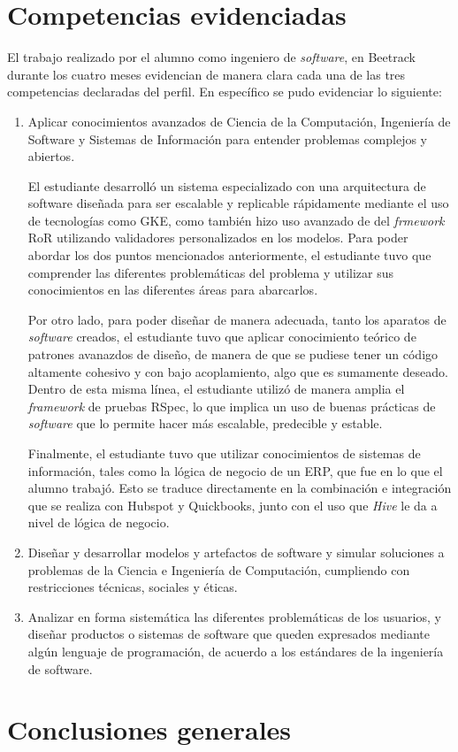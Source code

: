 \section{Competencias evidenciadas}

  El trabajo realizado por el alumno como ingeniero de \textit{software}, en Beetrack durante los cuatro meses evidencian de manera clara cada una de las tres competencias declaradas del perfil. En específico se pudo evidenciar lo siguiente:

  \begin{enumerate}
    \item Aplicar conocimientos avanzados de Ciencia de la Computación, Ingeniería de Software y Sistemas de Información para entender problemas complejos y abiertos.
    
    El estudiante desarrolló un sistema especializado con una arquitectura de software diseñada para ser escalable y replicable rápidamente mediante el uso de tecnologías como GKE, como también hizo uso avanzado de del \textit{frmework} RoR utilizando validadores personalizados en los modelos. Para poder abordar los dos puntos mencionados anteriormente, el estudiante tuvo que comprender las diferentes problemáticas del problema y utilizar sus conocimientos en las diferentes áreas para abarcarlos.

    Por otro lado, para poder diseñar de manera adecuada, tanto los aparatos de \textit{software} creados, el estudiante tuvo que aplicar conocimiento teórico de patrones avanazdos de diseño, de manera de que se pudiese tener un código altamente cohesivo y con bajo acoplamiento, algo que es sumamente deseado. Dentro de esta misma línea, el estudiante utilizó de manera amplia el \textit{framework} de pruebas RSpec, lo que implica un uso de buenas prácticas de \textit{software} que lo permite hacer más escalable, predecible y estable.

    Finalmente, el estudiante tuvo que utilizar conocimientos de sistemas de información, tales como la lógica de negocio de un ERP, que fue en lo que el alumno trabajó. Esto se traduce directamente en la combinación e integración que se realiza con Hubspot y Quickbooks, junto con el uso que \textit{Hive} le da a nivel de lógica de negocio.

    \item Diseñar y desarrollar modelos y artefactos de software y simular soluciones a problemas de la Ciencia e Ingeniería de Computación, cumpliendo con restricciones técnicas, sociales y éticas.

    \item Analizar en forma sistemática las diferentes problemáticas de los usuarios, y diseñar productos o sistemas de software que queden expresados mediante algún lenguaje de programación, de acuerdo a los estándares de la ingeniería de software.
  \end{enumerate}

\section{Conclusiones generales}

  